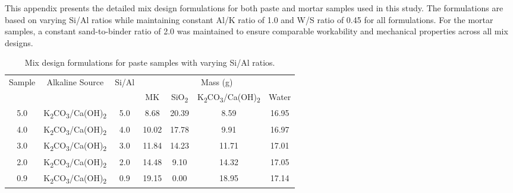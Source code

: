 \label{appendix:mix_designs}

This appendix presents the detailed mix design formulations for both paste and mortar samples used in this study.
The formulations are based on varying Si/Al ratios while maintaining constant Al/K ratio of 1.0 and W/S ratio of 0.45 for all formulations.
For the mortar samples, a constant sand-to-binder ratio of 2.0 was maintained to ensure comparable workability and mechanical properties across all mix designs.

\begin{table}[H]
  \centering
  \caption{Mix design formulations for paste samples with varying Si/Al ratios.}
  \vspace{0.5cm}
  {\footnotesize %
  \renewcommand{\arraystretch}{1.3} %
  \begin{tabular}{c c c c c c c}
    \hline
    \multirow{2}{*}{Sample} & \multirow{2}{*}{Alkaline Source} & \multirow{2}{*}{Si/Al} & \multicolumn{4}{c}{Mass (g)} \\
    \cline{4-7}
    & & & MK & SiO\textsubscript{2} & K\textsubscript{2}CO\textsubscript{3}/Ca(OH)\textsubscript{2} & Water \\
    \hline
    5.0 & K\textsubscript{2}CO\textsubscript{3}/Ca(OH)\textsubscript{2} & 5.0 & 8.68 & 20.39 & 8.59 & 16.95 \\
    4.0 & K\textsubscript{2}CO\textsubscript{3}/Ca(OH)\textsubscript{2} & 4.0 & 10.02 & 17.78 & 9.91 & 16.97 \\
    3.0 & K\textsubscript{2}CO\textsubscript{3}/Ca(OH)\textsubscript{2} & 3.0 & 11.84 & 14.23 & 11.71 & 17.01 \\
    2.0 & K\textsubscript{2}CO\textsubscript{3}/Ca(OH)\textsubscript{2} & 2.0 & 14.48 & 9.10 & 14.32 & 17.05 \\
    0.9 & K\textsubscript{2}CO\textsubscript{3}/Ca(OH)\textsubscript{2} & 0.9 & 19.15 & 0.00 & 18.95 & 17.14 \\
    \hline
  \end{tabular}
  }
\label{tab:paste_mix_designs}
\end{table}

